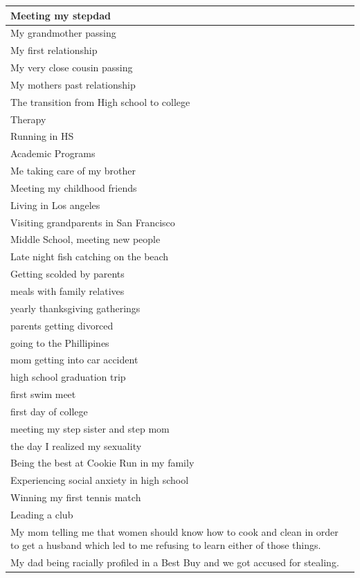 \documentclass[
  .7em,
  letterpaper,
  DIV=11,
  numbers=noendperiod]{scrartcl}
\begin{document}
\begin{table}
\begin{tabular}{l}
\hline
Meeting my stepdad\\
\hline
My grandmother passing\\
\hline
My first relationship\\
\hline
My very close cousin passing\\
\hline
My mothers past relationship\\
\hline
The transition from High school to college\\
\hline
Therapy\\
\hline
Running in HS\\
\hline
Academic Programs\\
\hline
Me taking care of my brother\\
\hline
Meeting my childhood friends\\
\hline
Living in Los angeles\\
\hline
Visiting grandparents in San Francisco\\
\hline
Middle School, meeting new people\\
\hline
Late night fish catching on the beach\\
\hline
Getting scolded by parents\\
\hline
meals with family relatives\\
\hline
yearly thanksgiving gatherings\\
\hline
parents getting divorced\\
\hline
going to the Phillipines\\
\hline
mom getting into car accident\\
\hline
high school graduation trip\\
\hline
first swim meet\\
\hline
first day of college\\
\hline
meeting my step sister and step mom\\
\hline
the day I realized my sexuality\\
\hline
Being the best at Cookie Run in my family\\
\hline
Experiencing social anxiety in high school\\
\hline
Winning my first tennis match\\
\hline
Leading a club\\
\hline
My mom telling me that women should know how to cook and clean in order to get a husband which led to me refusing to learn either of those things.\\
\hline
My dad being racially profiled in a Best Buy and we got accused for stealing.\\

\end{tabular}
\end{table}
\end{document}
